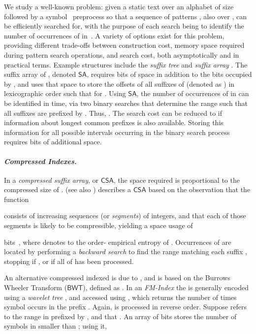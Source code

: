 \documentclass{llncs}
\newcommand{\myparagraph}[1]{\paragraph*{\normalsize\it#1.}}
\newcommand{\CSA}[0]{\ensuremath{\mathsf{CSA}}}
\newcommand{\SUFF}[0]{\ensuremath{\mathsf{SA}}}
\newcommand{\BWT}[0]{\ensuremath{\mathsf{BWT}}}
\begin{document}
We study a well-known problem:
given a static text  over an alphabet  of size
 followed by a symbol \, preprocess  so that a sequence of patterns
, also over , can be efficiently searched for,
with the purpose of each search being to identify the number of
occurrences  of  in~.
A variety of options exist for this problem, providing different
trade-offs between construction cost, memory space required during
pattern search operations, and search cost, both asymptotically and
in practical terms.
Example structures include the {\emph{suffix tree}}
{\cite{acfgm-cacm16,w-swat73}} and {\emph{suffix array}}
{\cite{mm93siamjc}}.
The suffix array of , denoted {\SUFF}, requires  bits of space in addition to the  bits
occupied by , and uses that space to store the offsets
 of all  suffixes of  (denoted as
) in lexicographic order such that
 for .
Using {\SUFF}, the number of occurrences of  in  can be
identified in  time, via two binary searches that
determine the range  such that all suffixes
 are prefixed by .
Thus, .
The search cost can be reduced to  if
information about longest common prefixes is also available.
Storing this information for all possible intervals 
occurring in the binary search process requires
 bits of additional space.

\myparagraph{Compressed Indexes}

In a {\emph{compressed suffix array}}, or {\CSA},
the space required is proportional to the compressed size of .
{\textcite{s-jalg03}} (see also {\textcite{gv-stoc00}}) describes a
{\CSA} based on the observation that the function

consists of  increasing sequences (or {\emph{segments}}) of
integers, and that each of those segments is likely to be
compressible, yielding a space usage of

bits~\cite{nm-csurv07}, where  denotes to the order-
empirical entropy of .
Occurrences of  are located by performing a {\emph{backward
search}}
to find the
range  matching each suffix ,
stopping if , or if all of  has been
processed.

An alternative compressed indexed is due to {\textcite{fm00focs}},
and is based on the Burrows Wheeler Transform (\BWT), defined as
.
In an {\emph{FM-Index}} the  is generally encoded using a
{\emph{wavelet tree}} {\cite{ggv03soda}}, and accessed using
, which returns the number of times symbol 
occurs in the prefix .
Again,  is processed in reverse order.
Suppose  refers to the range in 
prefixed by , and that .
An array  of  bits stores the number of symbols 
in  smaller than ; using it,
\end{document}
